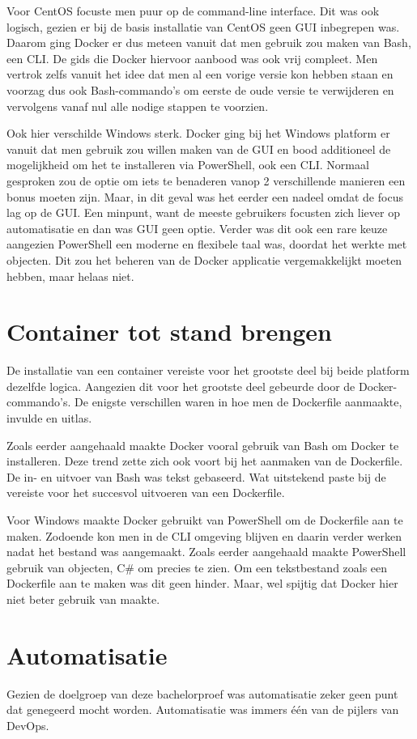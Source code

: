 Voor CentOS focuste men puur op de command-line interface. Dit was ook logisch, gezien er bij de basis installatie van CentOS geen GUI inbegrepen was. Daarom ging Docker er dus meteen vanuit dat men gebruik zou maken van Bash, een CLI. De gids die Docker hiervoor aanbood was ook vrij compleet. Men vertrok zelfs vanuit het idee dat men al een vorige versie kon hebben staan en voorzag dus ook Bash-commando's om eerste de oude versie te verwijderen en vervolgens vanaf nul alle nodige stappen te voorzien.

Ook hier verschilde Windows sterk. Docker ging bij het Windows platform er vanuit dat men gebruik zou willen maken van de GUI en bood additioneel de mogelijkheid om het te installeren via PowerShell, ook een CLI. Normaal gesproken zou de optie om iets te benaderen vanop 2 verschillende manieren een bonus moeten zijn. Maar, in dit geval was het eerder een nadeel omdat de focus lag op de GUI. Een minpunt, want de meeste gebruikers focusten zich liever op automatisatie en dan was GUI geen optie. Verder was dit ook een rare keuze aangezien PowerShell een moderne en flexibele taal was, doordat het werkte met objecten. Dit zou het beheren van de Docker applicatie vergemakkelijkt moeten hebben, maar helaas niet.

\section{Container tot stand brengen}
De installatie van een container vereiste voor het grootste deel bij beide platform dezelfde logica. Aangezien dit voor het grootste deel gebeurde door de Docker-commando's. De enigste verschillen waren in hoe men de Dockerfile aanmaakte, invulde en uitlas.

Zoals eerder aangehaald maakte Docker vooral gebruik van Bash om Docker te installeren. Deze trend zette zich ook voort bij het aanmaken van de Dockerfile. De in- en uitvoer van Bash was tekst gebaseerd. Wat uitstekend paste bij de vereiste voor het succesvol uitvoeren van een Dockerfile.

Voor Windows maakte Docker gebruikt van PowerShell om de Dockerfile aan te maken. Zodoende kon men in de CLI omgeving blijven en daarin verder werken nadat het bestand was aangemaakt. Zoals eerder aangehaald maakte PowerShell gebruik van objecten, C\# om precies te zien. Om een tekstbestand zoals een Dockerfile aan te maken was dit geen hinder. Maar, wel spijtig dat Docker hier niet beter gebruik van maakte.

\section{Automatisatie}
Gezien de doelgroep van deze bachelorproef was automatisatie zeker geen punt dat genegeerd mocht worden. Automatisatie was immers één van de pijlers van DevOps.

